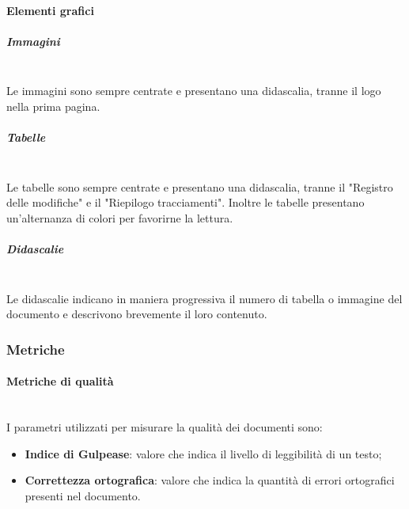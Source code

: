             \paragraph{Elementi grafici}
                \subparagraph{Immagini}\mbox{}\\ [1mm]
                    Le immagini sono sempre centrate e presentano una didascalia, tranne il logo nella prima pagina.
                \subparagraph{Tabelle}\mbox{}\\ [1mm]
                    Le tabelle sono sempre centrate e presentano una didascalia, tranne il "Registro delle modifiche" e il "Riepilogo tracciamenti".
                    Inoltre le tabelle presentano un'alternanza di colori per favorirne la lettura.
                \subparagraph{Didascalie}\mbox{}\\ [1mm]
                    Le didascalie indicano in maniera progressiva il numero di tabella o immagine del documento e descrivono brevemente il loro contenuto.
            \subsubsection{Metriche}
                \paragraph{Metriche di qualità}\mbox{}\\ [1mm]
           		I parametri utilizzati per misurare la qualità dei documenti sono:
                \begin{itemize}
                	\item \textbf{Indice di Gulpease}: valore che indica il livello di leggibilità di un testo;
                	\item \textbf{Correttezza ortografica}: valore che indica la quantità di errori ortografici presenti nel documento.
                \end{itemize}                        

